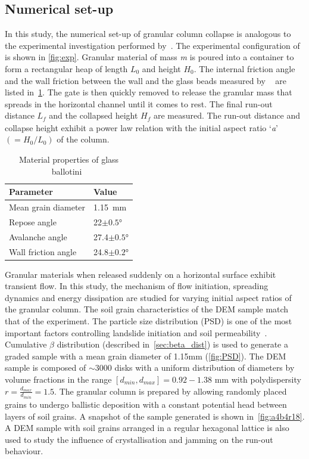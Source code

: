 \subsection{Numerical set-up}

In this study, the numerical set-up of granular column collapse is analogous to 
the  experimental investigation performed by~\citet{Lajeunesse2004}. The 
experimental configuration of~\citet{Lajeunesse2004} is shown in 
\cref{fig:exp}. Granular material of mass \textit{m} is poured into a 
container to form a rectangular heap of length ${L}_{\textit{0}}$ and height 
${H}_{\textit{0}}$. The internal friction angle 
and the wall friction between the wall and the glass beads measured by 
~\citet{Lajeunesse2004} are listed in~\cref{table:mat_prop}. The gate is then 
quickly removed to release the granular mass that spreads in the horizontal 
channel until it comes to rest. The final run-out distance ${L}_{\textit{f}}$ 
and the collapsed height $H_{\textit{f}}$ are measured. The run-out distance 
and collapse height exhibit a power law relation with the initial aspect ratio 
`\textit{a}' $(=H_{\textit{0}}/L_{\textit{0}})$ of the column. 

\begin{table}[tbhp]
\caption{Material properties of glass ballotini~\citep{Lajeunesse2004}}
\label{table:mat_prop}
\centering
\begin{tabular}{ll}
\toprule
\textbf{Parameter} & \textbf{Value} \\ \midrule
Mean grain diameter & 1.15~\si{\mm} \\
Repose angle & 22$\pm 0.5$\si{\degree} \\
Avalanche angle & 27.4$\pm 0.5$\si{\degree} \\
Wall friction angle & 24.8$\pm 0.2$\si{\degree}\\
\bottomrule
\end{tabular}
\end{table}


Granular materials when released suddenly on a 
horizontal surface exhibit transient flow. In this study, the mechanism of flow 
initiation, spreading dynamics and energy dissipation are studied for varying 
initial aspect ratios of the granular column. The soil grain characteristics of 
the DEM sample match that of the experiment. The particle size distribution 
(PSD) is one of the most important factors controlling landslide initiation and 
soil permeability~\citep{Utili2014}. Cumulative $\beta$ distribution (described 
in~\cref{sec:beta_dist}) is used to generate a graded sample with a mean grain 
diameter of 1.15\si{\mm} (\cref{fig:PSD}). 
The DEM sample is composed of $\sim3000$ disks with a uniform distribution of 
diameters by volume fractions in the range $[d_{min}, d_{max}] = 0.92 - 1.38$ 
\si{\mm} with polydispersity $r = \frac{d_{max} }{d_{min}} = 1.5$. The 
granular column is prepared by allowing randomly placed grains to undergo 
ballistic deposition with a constant potential head between layers of soil 
grains. A snapshot of the sample generated is shown in~\cref{fig:a4b4r18}. A 
DEM sample with soil grains arranged in a regular hexagonal lattice is also 
used to study the influence of crystallisation and jamming on the run-out 
behaviour.

